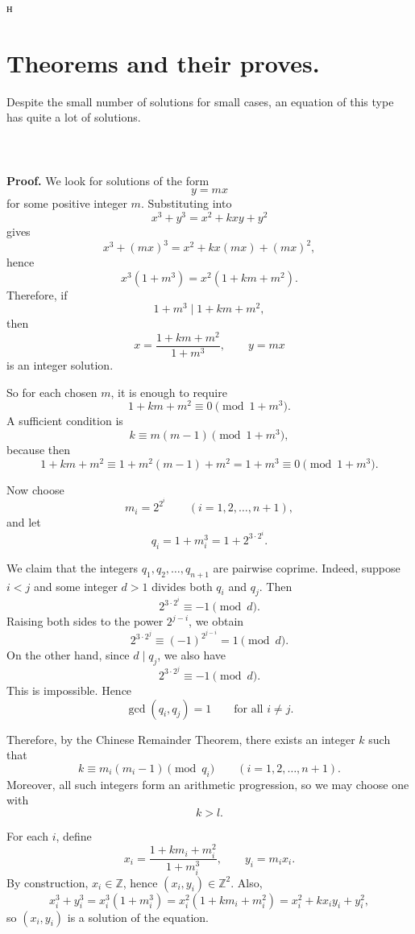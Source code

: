 н\documentclass[a4paper,14pt]{extarticle}  %
\begin{document}
\section{Theorems and their proves.}
Despite the small number of solutions for small cases, an equation of this type has quite a lot of solutions.
\\
\\
\noindent{}
\\
\\
\textbf{Proof.}
We look for solutions of the form
\[
y=mx
\]
for some positive integer \(m\). Substituting into
\[
x^3+y^3=x^2+kxy+y^2
\]
gives
\[
x^3+(mx)^3=x^2+kx(mx)+(mx)^2,
\]
hence
\[
x^3(1+m^3)=x^2(1+km+m^2).
\]
Therefore, if
\[
1+m^3 \mid 1+km+m^2,
\]
then
\[
x=\frac{1+km+m^2}{1+m^3},\qquad y=mx
\]
is an integer solution.

So for each chosen \(m\), it is enough to require
\[
1+km+m^2\equiv 0 \pmod{1+m^3}.
\]
A sufficient condition is
\[
k\equiv m(m-1)\pmod{1+m^3},
\]
because then
\[
1+km+m^2 \equiv 1+m^2(m-1)+m^2 = 1+m^3 \equiv 0 \pmod{1+m^3}.
\]

Now choose
\[
m_i=2^{2^i}\qquad (i=1,2,\dots,n+1),
\]
and let
\[
q_i=1+m_i^3=1+2^{3\cdot 2^i}.
\]

We claim that the integers \(q_1,q_2,\dots,q_{n+1}\) are pairwise coprime.  
Indeed, suppose \(i<j\) and some integer \(d>1\) divides both \(q_i\) and \(q_j\). Then
\[
2^{3\cdot 2^i}\equiv -1 \pmod d.
\]
Raising both sides to the power \(2^{j-i}\), we obtain
\[
2^{3\cdot 2^j}\equiv (-1)^{2^{j-i}}=1 \pmod d.
\]
On the other hand, since \(d\mid q_j\), we also have
\[
2^{3\cdot 2^j}\equiv -1 \pmod d.
\]
This is impossible. Hence
\[
\gcd(q_i,q_j)=1 \qquad \text{for all } i\ne j.
\]

Therefore, by the Chinese Remainder Theorem, there exists an integer \(k\) such that
\[
k\equiv m_i(m_i-1)\pmod{q_i}
\qquad (i=1,2,\dots,n+1).
\]
Moreover, all such integers form an arithmetic progression, so we may choose one with
\[
k>l.
\]

For each \(i\), define
\[
x_i=\frac{1+km_i+m_i^2}{1+m_i^3},\qquad y_i=m_i x_i.
\]
By construction, \(x_i\in\mathbb Z\), hence \((x_i,y_i)\in\mathbb Z^2\). Also,
\[
x_i^3+y_i^3=x_i^3(1+m_i^3)
= x_i^2(1+km_i+m_i^2)
= x_i^2+kx_i y_i+y_i^2,
\]
so \((x_i,y_i)\) is a solution of the equation.
\end{document}
